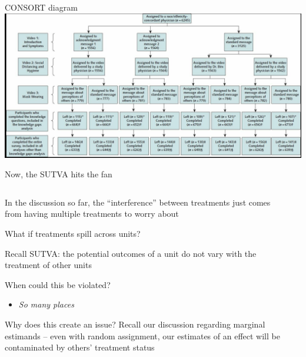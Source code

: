 \documentclass[notes,11pt, aspectratio=169]{beamer}
\newenvironment{wideitemize}{\itemize\addtolength{\itemsep}{10pt}}{\enditemize}
\begin{document}
\begin{frame}{CONSORT diagram}
  \includegraphics[width=\linewidth]{images/consort.jpeg}
\end{frame}

\begin{frame}{Now, the SUTVA hits the fan}
\begin{columns}[T] %
  \begin{column}{.7\textwidth}
    \begin{wideitemize}
    \item In the discussion so far, the ``interference'' between
      treatments just comes from having multiple treatments to worry
      about
    \item What if treatments spill across units?
    \item Recall SUTVA: the potential outcomes of a unit do not vary
      with the treatment of other units
    \item When could this be violated?
      \begin{itemize}
      \item \emph{So many places}
      \end{itemize}
    \item Why does this create an issue? Recall our discussion regarding marginal estimands -- even with random assignment, our estimates of an effect will be contaminated by others' treatment status
    \end{wideitemize}    

\end{column}%
  \hfill%
  \begin{column}{.3\textwidth}
    \begin{center}
\end{center}
\end{column}
\end{columns}
\end{frame}
\end{document}
